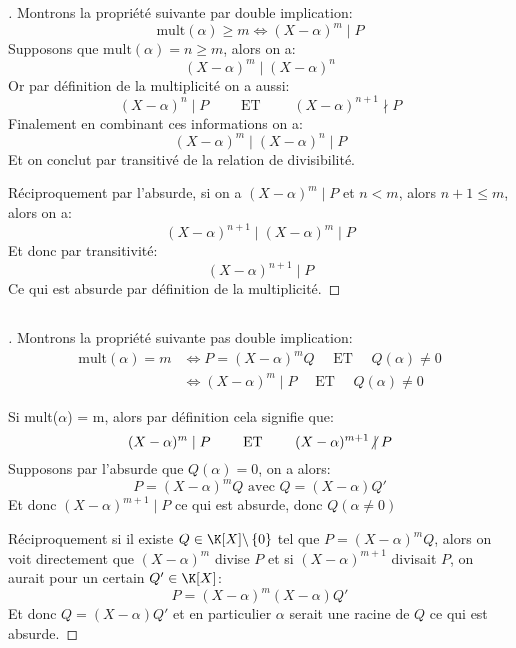 \documentclass{report}
\begin{document}
   \subsection*{}
   \begin{proof}[\unskip\nopunct]
      Montrons la propriété suivante par double implication:
      \[
         \text{mult}(\alpha) \geq m \Longleftrightarrow (X-\alpha)^m \mid P
      \]
      Supposons que \(\text{mult}(\alpha) = n \geq m\), alors on a:
      \[
         (X - \alpha)^{m} \mid  (X - \alpha)^{n}
      \]
      Or par définition de la multiplicité on a aussi:
      \[
         (X - \alpha)^n \mid  P \quad\quad \text{ ET } \quad\quad (X - \alpha)^{n+1} \nmid P   
      \]
      Finalement en combinant ces informations on a:
      \[
         (X - \alpha)^{m} \mid  (X - \alpha)^{n} \mid P
      \]
      Et on conclut par transitivé de la relation de divisibilité.\<
   
      Réciproquement par l'absurde, si on a \((X - \alpha)^m \mid P\) et \(n < m\), alors \(n + 1 \leq m\), alors on a:
      \[
         (X - \alpha)^{n+1} \mid (X - \alpha)^{m} \mid P
      \]
      Et donc par transitivité:
      \[
         (X - \alpha)^{n+1} \mid P
      \]
      Ce qui est absurde par définition de la multiplicité.
   \end{proof}
   \pagebreak

   \subsection*{}
   \begin{proof}[\unskip\nopunct]
      Montrons la propriété suivante pas double implication:
      \begin{align*}
         \text{mult}(\alpha) = m &\Longleftrightarrow P = (X - \alpha)^mQ \quad \text{ ET } \quad Q(\alpha) \neq 0\\
         &\Longleftrightarrow (X - \alpha)^m \mid P \quad \text{ ET } \quad Q(\alpha) \neq 0
      \end{align*}

      Si mult(\(\alpha\)) = m, alors par définition cela signifie que: 
      \[
         (X - \alpha)^m \mid P \quad \quad \text{ ET } \quad\quad (X - \alpha)^{m+1} \centernot \mid P
      \]
      Supposons par l'absurde que \(Q(\alpha) = 0\), on a alors:
      \[
         P = (X - \alpha)^mQ \text{ avec } Q = (X-\alpha)Q'
      \]
      Et donc \((X-\alpha)^{m+1} \mid P\) ce qui est absurde, donc \(Q(\alpha \neq 0)\)\<

      Réciproquement si il existe \(Q \in \K[X] \backslash \, \{0\}\) tel que \(P = (X-\alpha)^mQ\), alors on voit directement que \((X-\alpha)^m\) divise \(P\) et si \((X-\alpha)^{m+1}\) divisait \(P\), on aurait pour un certain \(Q' \in \K[X]\):
      \[
         P = (X - \alpha)^m (X-\alpha)Q'   
      \]
      Et donc \(Q = (X-\alpha)Q' \) et en particulier \(\alpha\) serait une racine de \(Q\) ce qui est absurde.
   \end{proof}
   
\end{document}
